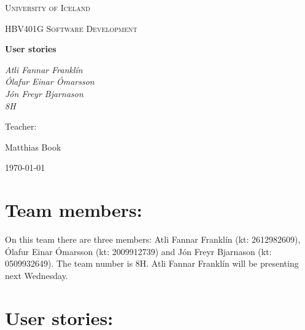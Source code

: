 \documentclass{article}
\begin{document}
\begin{titlepage}
	\centering
	{\scshape\LARGE University of Iceland \par}
	\vspace{1cm}
	{\scshape\Large HBV401G Software Development \par}
	\vspace{1.5cm}
	{\huge\bfseries User stories \par}
	\vspace{2cm}
	{\Large\itshape Atli Fannar Franklín \\ Ólafur Einar Ómarsson \\ Jón Freyr Bjarnason \\ 8H\par}
	\vfill
	Teacher: \par
	Matthias Book \par 

	\vfill

	{\large \today\par}
\end{titlepage}

\section*{Team members:}

On this team there are three members: Atli Fannar Franklín (kt: 2612982609), Ólafur Einar Ómarsson (kt: 2009912739) and Jón Freyr Bjarnason (kt: 0509932649). The team number is 8H. Atli Fannar Franklín will be presenting next Wednesday.

\section*{User stories:}
\end{document}
